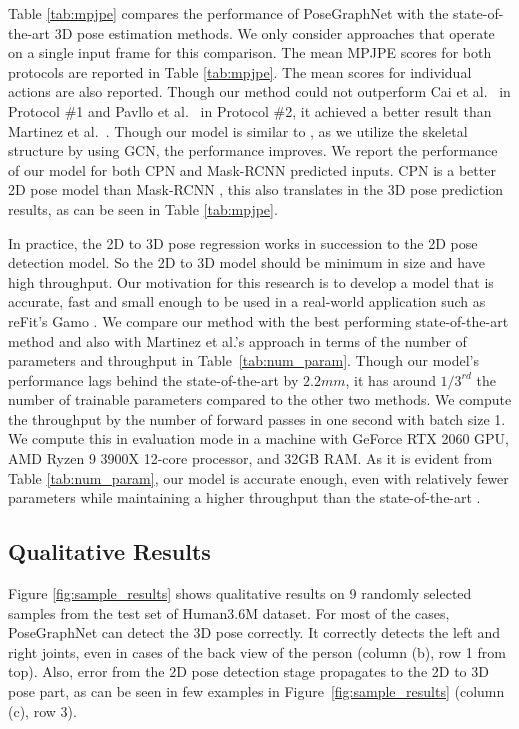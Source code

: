 \documentclass{article}
\begin{document}
Table \ref{tab:mpjpe} compares the performance of PoseGraphNet with the state-of-the-art 3D pose estimation methods.
We only consider approaches that operate on a single input frame for this comparison.
The mean MPJPE scores for both protocols are reported in Table \ref{tab:mpjpe}.
The mean scores for individual actions are also reported.
Though our method could not outperform Cai et al.~\cite{Cai2019} in Protocol \#1 and Pavllo et al.~\cite{Pavllo2019} in Protocol \#2, it achieved a better result than Martinez et al.~\cite{Martinez2017}.
Though our model is similar to \cite{Martinez2017}, as we utilize the skeletal structure by using GCN, the performance improves.
We report the performance of our model for both CPN \cite{Chen2018} and Mask-RCNN \cite{he2017mask} predicted inputs.
CPN is a better 2D pose model than Mask-RCNN \cite{Chen2018}, this also translates in the 3D pose prediction results, as can be seen in Table \ref{tab:mpjpe}.

In practice, the 2D to 3D pose regression works in succession to the 2D pose detection model.
So the 2D to 3D model should be minimum in size and have high throughput.
Our motivation for this research is to develop a model that is accurate, fast and small enough to be used in a real-world application such as reFit's Gamo \cite{refit}.
We compare our method with the best performing state-of-the-art method \cite{Cai2019} and also with Martinez et al.'s approach \cite{Martinez2017} in terms of the number of parameters and throughput in Table~\ref{tab:num_param}.
Though our model's performance lags behind the state-of-the-art \cite{Cai2019} by $2.2mm$, it has around $1/3^{rd}$ the number of trainable parameters compared to the other two methods.
We compute the throughput by the number of forward passes in one second with batch size 1.
We compute this in evaluation mode in a machine with GeForce RTX 2060 GPU, AMD Ryzen 9 3900X 12-core processor, and 32GB RAM.
As it is evident from Table \ref{tab:num_param}, our model is accurate enough, even with relatively fewer parameters while maintaining a higher throughput than the state-of-the-art \cite{Cai2019}.

\subsection{Qualitative Results}
Figure \ref{fig:sample_results} shows qualitative results on 9 randomly selected samples from the test set of Human3.6M dataset.
For most of the cases, PoseGraphNet can detect the 3D pose correctly.
It correctly detects the left and right joints, even in cases of the back view of the person (column (b), row 1 from top).
Also, error from the 2D pose detection stage propagates to the 2D to 3D pose part, as can be seen in few examples in Figure~\ref{fig:sample_results} (column (c), row 3).
\end{document}
